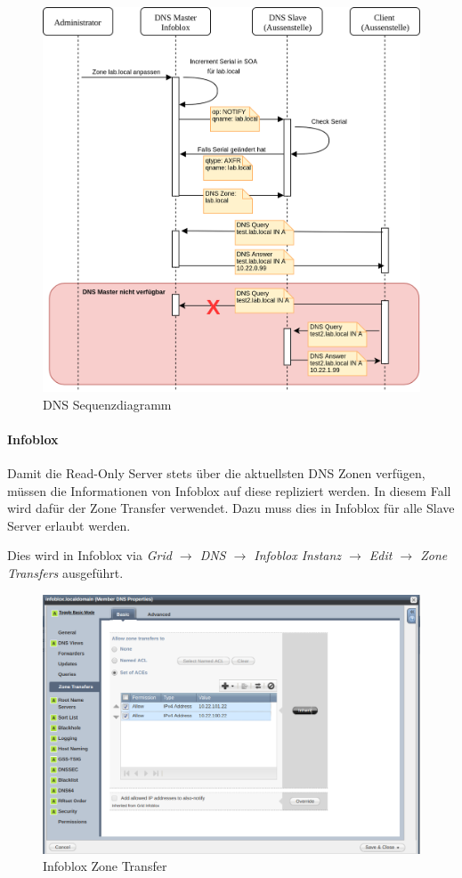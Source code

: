 \begin{figure}[H]
	\centering
	\includegraphics[width=0.8\linewidth]{img/Absicherung/DNS_Sequenzdiagram.png}
	\caption{DNS Sequenzdiagramm}
	\label{fig:DNS Sequenzdiagramm}
\end{figure}
\paragraph{Infoblox}

Damit die Read-Only Server stets über die aktuellsten DNS Zonen verfügen, müssen die Informationen von Infoblox auf diese repliziert werden. In diesem Fall wird dafür der Zone Transfer verwendet. Dazu muss dies in Infoblox für alle Slave Server erlaubt werden. 

Dies wird in Infoblox via \textit{Grid $\rightarrow$ DNS $\rightarrow$ Infoblox Instanz $\rightarrow$ Edit $\rightarrow$ Zone Transfers} ausgeführt.

\begin{figure}[H]
	\centering
	\includegraphics[width=0.8\linewidth]{img/Absicherung/Infoblox_Zone_Transfer.png}
	\caption{Infoblox Zone Transfer}
	\label{fig:Infoblox Zone Transfer}
\end{figure}

